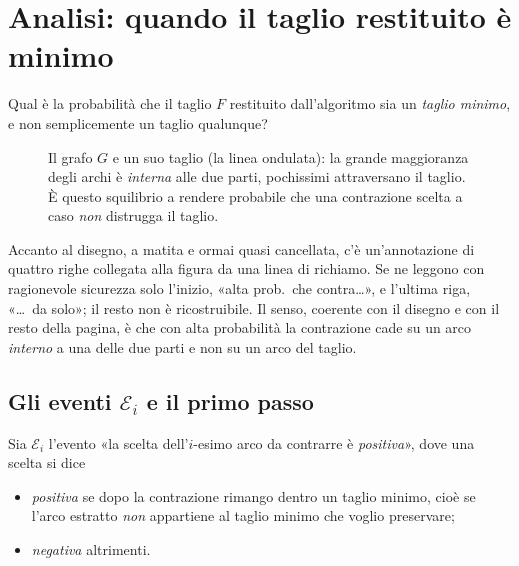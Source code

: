\section{Analisi: quando il taglio restituito è minimo}


\begin{domanda}
Qual è la probabilità che il taglio $F$ restituito dall'algoritmo sia un \emph{taglio
minimo}, e non semplicemente un taglio qualunque?
\end{domanda}

\begin{figure}[H]
  \centering
  
  \caption{Il grafo $G$ e un suo taglio (la linea ondulata): la grande maggioranza degli
  archi è \emph{interna} alle due parti, pochissimi attraversano il taglio. È questo
  squilibrio a rendere probabile che una contrazione scelta a caso \emph{non} distrugga il
  taglio.}
  \label{fig:mincut-schema-taglio}
\end{figure}

\begin{dubbio}
Accanto al disegno, a matita e ormai quasi cancellata, c'è un'annotazione di quattro righe
collegata alla figura da una linea di richiamo. Se ne leggono con ragionevole sicurezza solo
l'inizio, «alta prob.\ che contra\dots», e l'ultima riga, «\dots\ da solo»; il resto non è
ricostruibile. Il senso, coerente con il disegno e con il resto della pagina, è che con alta
probabilità la contrazione cade su un arco \emph{interno} a una delle due parti e non su un
arco del taglio.
\end{dubbio}

\subsection{Gli eventi \texorpdfstring{$\mathcal{E}_i$}{E\_i} e il primo passo}

\begin{definizione}\label{def:evento-Ei}
Sia $\mathcal{E}_i$ l'evento «la scelta dell'$i$-esimo arco da contrarre è \emph{positiva}»,
dove una scelta si dice
\begin{itemize}
  \item \emph{positiva} se dopo la contrazione rimango dentro un taglio minimo, cioè se
        l'arco estratto \emph{non} appartiene al taglio minimo che voglio preservare;
  \item \emph{negativa} altrimenti.
\end{itemize}
\end{definizione}

